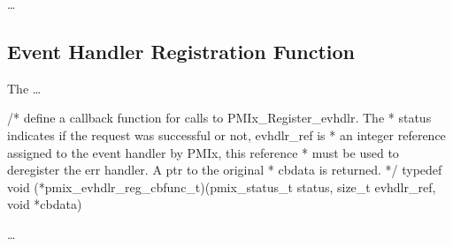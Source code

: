 \descr

\ldots



\subsection{Event Handler Registration Function}

The  \ldots

\cspecificstart
\begin{codepar}
/* define a callback function for calls to PMIx_Register_evhdlr. The
 * status indicates if the request was successful or not, evhdlr_ref is
 * an integer reference assigned to the event handler by PMIx, this reference
 * must be used to deregister the err handler. A ptr to the original
 * cbdata is returned. */
typedef void (*pmix_evhdlr_reg_cbfunc_t)(pmix_status_t status,
                                         size_t evhdlr_ref,
                                         void *cbdata)
\end{codepar}
\cspecificend

\descr

\ldots


